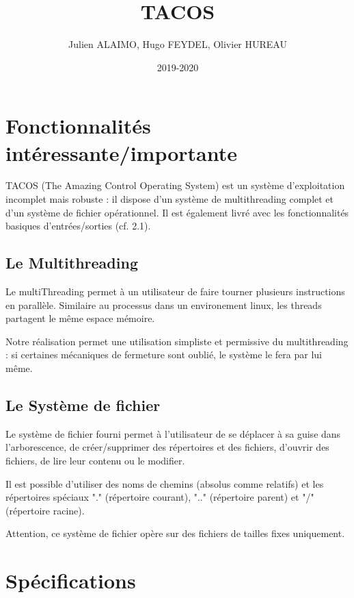 \documentclass{article}
\title{TACOS}
\author{Julien ALAIMO, Hugo FEYDEL, Olivier HUREAU }
\date{2019-2020}
\begin{document}
\maketitle

\section{Fonctionnalités intéressante/importante}

TACOS (The Amazing Control Operating System) est un système d'exploitation incomplet mais robuste : il dispose d'un système de multithreading complet et d'un système de fichier opérationnel. Il est également livré avec les fonctionnalités basiques d'entrées/sorties (cf. 2.1). 

\subsection{Le Multithreading}

Le multiThreading permet à un utilisateur de faire tourner plusieurs instructions en parallèle. Similaire au processus dans un environement linux, les threads partagent le même espace mémoire.

Notre réalisation permet une utilisation simpliste et permissive du multithreading : si certaines mécaniques de fermeture sont oublié, le système le fera par lui même. 

\subsection{Le Système de fichier}

Le système de fichier fourni permet à l'utilisateur de se déplacer à sa guise dans l'arborescence, de créer/supprimer des répertoires et des fichiers, d'ouvrir des fichiers, de lire leur contenu ou le modifier.

Il est possible d'utiliser des noms de chemins (absolus comme relatifs) et les répertoires spéciaux "." (répertoire courant), ".." (répertoire parent) et "/" (répertoire racine).

Attention, ce système de fichier opère sur des fichiers de tailles fixes uniquement. 

\newpage

\section{Spécifications}
\end{document}
